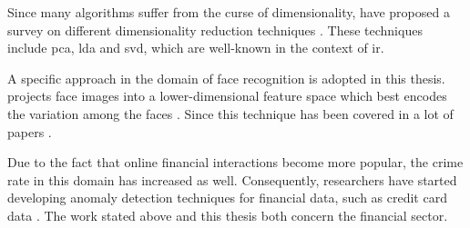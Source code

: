 Since many algorithms suffer from the curse of dimensionality, \citeauthor{dim_reduction2021} have proposed a survey on different dimensionality reduction techniques \cite{dim_reduction2021}.
These techniques include \ac{pca}, \ac{lda} and \ac{svd}, which are well-known in the context of \ac{ir}.


A specific approach in the domain of face recognition is adopted in this thesis.
\eigenfaces{} projects face images into a lower-dimensional feature space which best encodes the variation among the faces \cite{eigenfaces1991}.
Since \citeyear{eigenfaces1991} this technique has been covered in a lot of papers 
\cite{eigenfaces1991, eigenfaces1997, eigenfaces2013, face-recognition2008, face-recognition2020, face-recognition2021}.

Due to the fact that online financial interactions become more popular, the crime rate in this domain has increased as well.
Consequently, researchers have started developing anomaly detection techniques for financial data, such as credit card data 
\cite{credit_f_SOM2006, fd_ARIMA2021, cf_AE2020, AE_RF2021, dt_svm_2012, kaggle_ex2017}.
The work stated above and this thesis both concern the financial sector.
